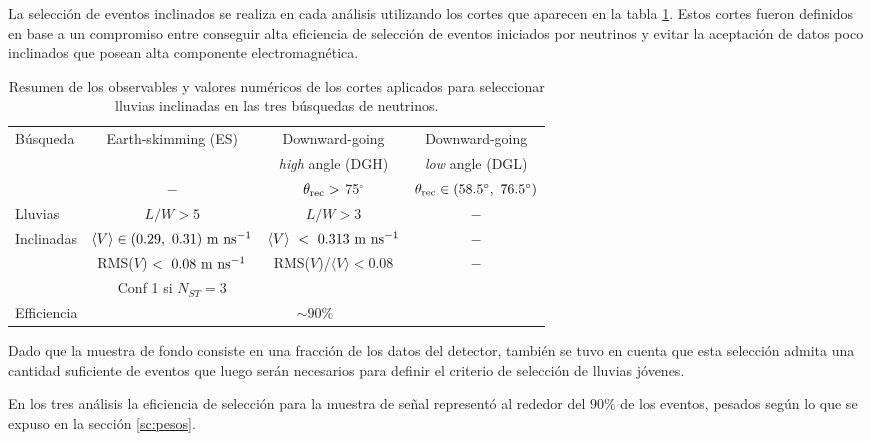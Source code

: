 		La selección de eventos inclinados se realiza en cada análisis utilizando los cortes que aparecen en la tabla \ref{tab:inclSel}.
		Estos cortes fueron definidos en base a un compromiso entre conseguir alta eficiencia de selección de eventos iniciados por neutrinos y evitar la aceptación de datos poco inclinados que posean alta componente electromagnética.
		\begin{table}[ht!]
		\begin{center}
			\renewcommand{\arraystretch}{1.4}
			\scriptsize
			\begin{tabular}{|l|c|c|c|}
			\hline
			Búsqueda & Earth-skimming (ES)           & Downward-going                        & Downward-going                       \\
					&                               & {\it high} angle (DGH)                & {\it low} angle (DGL)                \\
			\hline
						& $-$                             & $\theta_{\rm rec}>$ 75$^{\circ}$   &   $\theta_{\rm rec}\in (58.5^\circ,~76.5^{\circ})$\\
			Lluvias    & $L/W > 5$                                         & $L/W > 3$ & $-$ \\
			Inclinadas & $\langle V\rangle\in (0.29,~0.31)~{\rm m~ns^{-1}}$ & $\langle V \rangle~<~0.313~{\rm m~ns^{-1}}$ & $-$ \\
					& RMS($V$)$~<~0.08~{\rm m~ns^{-1}}$                 & RMS($V$)/$\langle V\rangle<0.08$ & $-$ \\
					& Conf 1 si $N_{ST}=3$ & & \\
			\hline
			Efficiencia & \multicolumn{3}{c|}{$\sim90\%$}\\
			\hline
			\end{tabular}
			\vskip -3mm
			\caption{Resumen de los observables y valores numéricos de los cortes aplicados para seleccionar lluvias inclinadas en las tres búsquedas de neutrinos.} 
		\end{center}

		\label{tab:inclSel}
		\end{table}
		Dado que la muestra de fondo consiste en una fracción de los datos del detector, también se tuvo en cuenta que esta selección admita una cantidad suficiente de eventos que luego serán necesarios para definir el criterio de selección de lluvias jóvenes.
		
		En los tres análisis la eficiencia de selección para la muestra de señal representó al rededor del $90\%$ de los eventos, pesados según lo que se expuso en la sección \ref{sc:pesos}.
		
